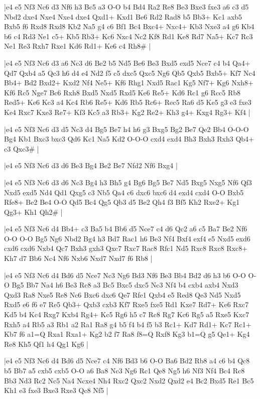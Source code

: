 \whitename{}
\blackname{}
\makegametitle
|e4 e5 Nf3 Nc6 d3 Nf6 h3 Bc5 a3 O-O b4 Bd4 Ra2 Re8 Be3 Bxe3 fxe3 a6 c3 d5 Nbd2 dxe4 Nxe4 Nxe4 dxe4 Qxd1+ Kxd1 Be6 Rd2 Rad8 b5 Bb3+ Kc1 axb5 Bxb5 f6 Rxd8 Rxd8 Kb2 Na5 g4 c6 Bf1 Bc4 Bxc4+ Nxc4+ Kb3 Nxe3 a4 g6 Kb4 b6 c4 Rd3 Ne1 c5+ Kb5 Rb3+ Kc6 Nxc4 Nc2 Kf8 Rd1 Ke8 Rd7 Na5+ Kc7 Rc3 Ne1 Re3 Rxh7 Rxe1 Kd6 Rd1+ Ke6 c4 Rh8\#  |

\whitename{}
\blackname{}
\makegametitle
|e4 e5 Nf3 Nc6 d3 a6 Nc3 d6 Be2 b5 Nd5 Be6 Be3 Bxd5 exd5 Nce7 c4 b4 Qa4+ Qd7 Qxb4 a5 Qc3 h6 d4 e4 Nd2 f5 c5 dxc5 Qxc5 Ng6 Qb5 Qxb5 Bxb5+ Kf7 Nc4 Bb4+ Bd2 Bxd2+ Kxd2 Nf4 Ne5+ Kf6 Rhg1 Nxd5 Rac1 Kg5 Nf7+ Kg6 Nxh8+ Kf6 Rc5 Nge7 Bc6 Rxh8 Bxd5 Nxd5 Rxd5 Ke6 Re5+ Kd6 Rc1 g6 Rcc5 Rb8 Red5+ Ke6 Kc3 a4 Kc4 Rb6 Re5+ Kd6 Rb5 Rc6+ Rec5 Ra6 d5 Ke5 g3 e3 fxe3 Ke4 Rxc7 Kxe3 Re7+ Kf3 Kc5 a3 Rb3+ Kg2 Re2+ Kh3 g4+ Kxg4 Rg3+ Kf4  |

\whitename{}
\blackname{}
\makegametitle
|e4 e5 Nf3 Nc6 d3 d5 Nc3 d4 Bg5 Be7 h4 h6 g3 Bxg5 Bg2 Be7 Qe2 Bb4 O-O-O Bg4 Kb1 Bxc3 bxc3 Qd6 Kc1 Na5 Kd2 O-O-O cxd4 exd4 Bh3 Bxh3 Rxh3 Qb4+ c3 Qxc3\#  |

\whitename{}
\blackname{}
\makegametitle
|e4 e5 Nf3 Nc6 d3 d6 Be3 Bg4 Be2 Be7 Nfd2 Nf6 Bxg4  |

\whitename{}
\blackname{}
\makegametitle
|e4 e5 Nf3 Nc6 d3 d6 Nc3 Bg4 h3 Bh5 g4 Bg6 Bg5 Be7 Nd5 Bxg5 Nxg5 Nf6 Qf3 Nxd5 exd5 Nd4 Qd1 Qxg5 c3 Nb5 Qa4 c6 dxc6 bxc6 d4 exd4 cxd4 O-O Bxb5 Rfe8+ Be2 Be4 O-O Qd5 Bc4 Qg5 Qb3 d5 Be2 Qh4 f3 Bf5 Kh2 Rxe2+ Kg1 Qg3+ Kh1 Qh2\#  |

\whitename{}
\blackname{}
\makegametitle
|e4 e5 Nf3 Nc6 d4 Bb4+ c3 Ba5 b4 Bb6 d5 Nce7 c4 d6 Qc2 a6 c5 Ba7 Be2 Nf6 O-O O-O Bg5 Ng6 Nbd2 Bg4 h3 Bd7 Rac1 h6 Be3 Nf4 Bxf4 exf4 e5 Nxd5 exd6 cxd6 cxd6 Nxb4 Qc7 Bxh3 gxh3 Qxc7 Rxc7 Rac8 Rfc1 Nd5 Rxc8 Rxc8 Rxc8+ Kh7 d7 Bb6 Nc4 Nf6 Nxb6 Nxd7 Nxd7 f6 Rb8  |

\whitename{}
\blackname{}
\makegametitle
|e4 e5 Nf3 Nc6 d4 Bd6 d5 Nce7 Nc3 Ng6 Bd3 Nf6 Be3 Bb4 Bd2 d6 h3 b6 O-O O-O Bg5 Bb7 Na4 h6 Be3 Rc8 a3 Bc5 Bxc5 dxc5 Nc3 Nf4 b4 cxb4 axb4 Nxd3 Qxd3 Ra8 Nxe5 Re8 Nc6 Bxc6 dxc6 Qe7 Rfe1 Qxb4 e5 Red8 Qe3 Nd5 Nxd5 Rxd5 e6 f6 e7 Re5 Qb3+ Qxb3 cxb3 Kf7 Rxe5 fxe5 Rd1 Kxe7 Rd7+ Ke6 Rxc7 Kd5 b4 Kc4 Rxg7 Kxb4 Rg4+ Kc5 Rg6 h5 c7 Rc8 Rg7 Kc6 Rg5 a5 Rxe5 Kxc7 Rxh5 a4 Rb5 a3 Rb1 a2 Ra1 Ra8 g4 b5 f4 b4 f5 b3 Rc1+ Kd7 Rd1+ Kc7 Rc1+ Kb7 f6 a1=Q Rxa1 Rxa1+ Kg2 b2 f7 Ra8 f8=Q Rxf8 Kg3 b1=Q g5 Qe1+ Kg4 Re8 Kh5 Qf1 h4 Qg1 Kg6  |

\whitename{}
\blackname{}
\makegametitle
|e4 e5 Nf3 Nc6 d4 Bd6 d5 Nce7 c4 Nf6 Bd3 b6 O-O Ba6 Bd2 Rb8 a4 c6 b4 Qc8 b5 Bb7 a5 cxb5 cxb5 O-O a6 Ba8 Nc3 Ng6 Rc1 Qe8 Ng5 h6 Nf3 Nf4 Bc4 Rc8 Bb3 Nd3 Rc2 Nc5 Na4 Ncxe4 Nh4 Rxc2 Qxc2 Nxd2 Qxd2 e4 Bc2 Bxd5 Re1 Bc5 Kh1 e3 fxe3 Bxe3 Rxe3 Qc8 Nf5  |

